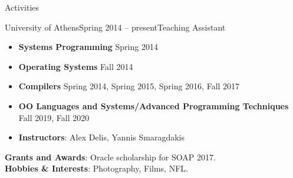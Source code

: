 \documentclass{resume}
\begin{document}
\begin{rSection}{Activities}
\begin{rSubsection}{University of Athens}{Spring 2014 -- present}{Teaching Assistant}{}

\begin{itemize}
  \item {\bf Systems Programming}  Spring 2014
  \item {\bf Operating Systems}  Fall 2014
  \item {\bf Compilers } Spring 2014, Spring 2015, Spring 2016, Fall 2017
  \item {\bf OO Languages and Systems/Advanced Programming Techniques} Fall 2019, Fall 2020
  \item {\bf Instructors}: Alex Delis, Yannis Smaragdakis
\end{itemize}

\end{rSubsection}
{\bf Grants and Awards}: Oracle scholarship for SOAP 2017. \\
{\bf Hobbies \& Interests}: Photography, Films, NFL.
\end{rSection}
\end{document}
